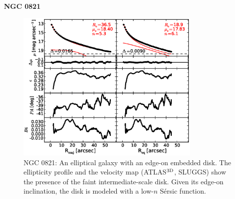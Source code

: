 \documentclass[preprint2]{emulateapj}
\newcommand{\fitfigurewidth}{0.8\textwidth}
\begin{document}
  \clearpage\newpage\noindent

  {\bf NGC 0821 \\}

  \begin{figure}[h]
  \begin{center}
  \includegraphics[width=\fitfigurewidth]{images/n0821_1Dfit.eps}
  \caption{NGC 0821: 
  An elliptical galaxy with an edge-on embedded disk. 
  The ellipticity profile and the velocity map (ATLAS$^{\rm 3D}$, SLUGGS) show the presence of the faint intermediate-scale disk. 
  Given its edge-on inclination, the disk is modeled with a low-$n$ S\'ersic function.   
  }
  \end{center}
  \end{figure}
  
\end{document}
